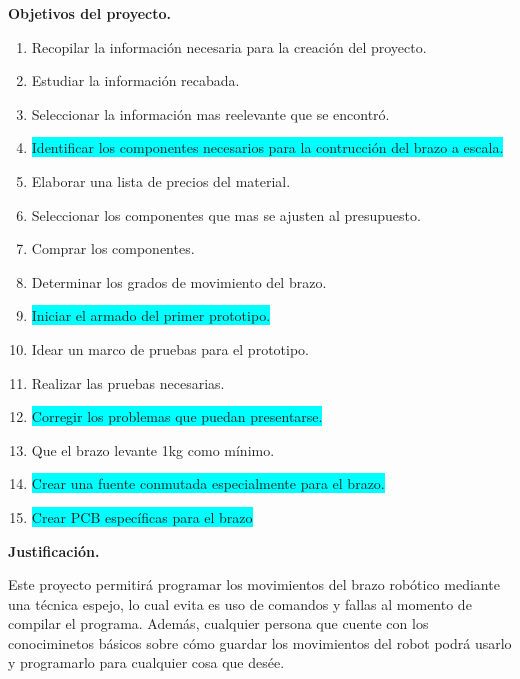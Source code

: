 \documentclass[letterpaper]{article}
\begin{document}
\begin{large}
    \begin{LARGE}
        \textbf{Objetivos del proyecto.}\\
    \end{LARGE}
    \begin{enumerate} 
        \item Recopilar la información necesaria para la creación del proyecto.
        \item Estudiar la información recabada.
        \item Seleccionar la información mas reelevante que se encontró.
        \item \colorbox{cyan}{Identificar los componentes necesarios para la contrucción del brazo a escala.} 
        \item Elaborar una lista de precios del material.
        \item Seleccionar los componentes que mas se ajusten al presupuesto.
        \item Comprar los componentes.
        \item Determinar los grados de movimiento del brazo.
        \item \colorbox{cyan}{Iniciar el armado del primer prototipo.}
        \item Idear un marco de pruebas para el prototipo.
        \item Realizar las pruebas necesarias.
        \item \colorbox{cyan}{Corregir los problemas que puedan presentarse.}
        \item Que el brazo levante 1kg como mínimo.
        \item \colorbox{cyan}{Crear una fuente conmutada especialmente para el brazo.}
        \item \colorbox{cyan}{Crear PCB específicas para el brazo}
    \end{enumerate}
\end{large}
\vspace{1.5cm}
\begin{large}
    \begin{LARGE}
        \textbf{Justificación.}\\
    \end{LARGE}
Este proyecto permitirá programar los movimientos del brazo robótico mediante una técnica espejo, lo cual evita es uso de comandos y fallas al momento de compilar el programa. Además, cualquier persona que cuente con los conociminetos básicos sobre cómo guardar los movimientos del robot podrá usarlo y programarlo para cualquier cosa que desée. 
\end{large}
\end{document}
